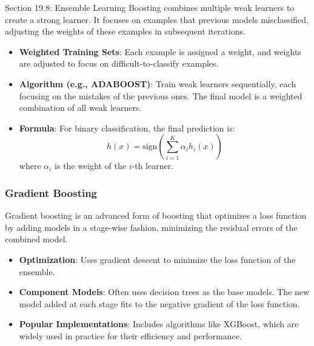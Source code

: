 \begin{notes}{Section 19.8: Ensemble Learning}
    Boosting combines multiple weak learners to create a strong learner. It focuses on examples that previous models misclassified, adjusting the weights of these examples in subsequent iterations.
    
    \begin{highlight}[Boosting]
    
        \begin{itemize}
            \item \textbf{Weighted Training Sets}: Each example is assigned a weight, and weights are adjusted to focus on difficult-to-classify examples.
            \item \textbf{Algorithm (e.g., ADABOOST)}: Train weak learners sequentially, each focusing on the mistakes of the previous ones. The final model is a weighted combination of all weak learners.
            \item \textbf{Formula}: For binary classification, the final prediction is:
            \[
            h(x) = \text{sign}\left(\sum_{i=1}^{K} \alpha_i h_i(x)\right)
            \]
            where $\alpha_i$ is the weight of the $i$-th learner.
        \end{itemize}
    
    \end{highlight}
    
    \subsubsection*{Gradient Boosting}
    
    Gradient boosting is an advanced form of boosting that optimizes a loss function by adding models in a stage-wise fashion, minimizing the residual errors of the combined model.
    
    \begin{highlight}
    
        \begin{itemize}
            \item \textbf{Optimization}: Uses gradient descent to minimize the loss function of the ensemble.
            \item \textbf{Component Models}: Often uses decision trees as the base models. The new model added at each stage fits to the negative gradient of the loss function.
            \item \textbf{Popular Implementations}: Includes algorithms like XGBoost, which are widely used in practice for their efficiency and performance.
        \end{itemize}
    

\end{highlight}
\end{notes}
